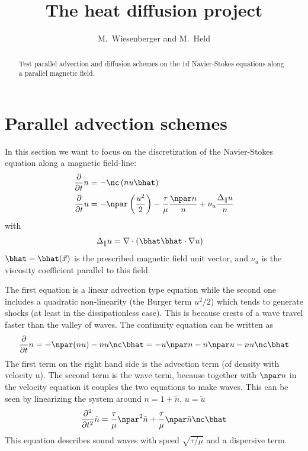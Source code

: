 


\newcommand{\PP}{H^+}
\newcommand{\QQ}{H^-}



\title{The heat diffusion project}
\author{ M.~Wiesenberger and M.~Held}
\maketitle

\begin{abstract}
    Test parallel advection and diffusion schemes on the 1d Navier-Stokes equations
    along a parallel magnetic field.
\end{abstract}
\tableofcontents

\section{Parallel advection schemes}
In this section we want to focus on the discretization of the Navier-Stokes equation
along a magnetic field-line:
\begin{align}
    \frac{\partial}{\partial t} n &= - \nc\left( nu\bhat\right) \\
    \frac{\partial}{\partial t} u &= - \npar\left(\frac{u^2}{2}\right) - \frac{\tau}{\mu} \frac{\npar n}{n} + \nu_u \frac{\Delta_\parallel u}{n}
\end{align}
with
\begin{align}
\Delta_\parallel u &= \nabla\cdot ( \bhat\bhat\cdot\nabla u)
\end{align}
$\bhat = \bhat(\vec x)$ is the prescribed magnetic field unit vector,
and $\nu_u$ is the viscosity coefficient parallel to this field.

The first equation is a linear advection type equation while the second one includes
a quadratic non-linearity (the Burger term $u^2/2$) which tends to generate
shocks (at least in the dissipationless case). This is because crests of a wave
travel faster than the valley of waves.
The continuity equation can be written as
\begin{align}
    \frac{\partial}{\partial t} n = - \npar (nu) - nu \nc\bhat = -u\npar n - n \npar u - nu\nc \bhat
\end{align}
The first term on the right hand side is the advection term (of density with velocity u). The second term is the wave term, because together with $\npar n$ in the velocity
equation it couples the two equations to make waves. This can be seen by linearizing
the system around $n= 1 + \tilde n$, $u = \tilde u$
\begin{align}
    \frac{\partial^2}{\partial t^2} \tilde n = \frac{\tau}{\mu} \npar^2 \tilde n + \frac{\tau}{\mu} \npar \tilde n \nc\bhat
\end{align}
This equation describes sound waves with speed $\sqrt{\tau/\mu}$ and a
dispersive term.

